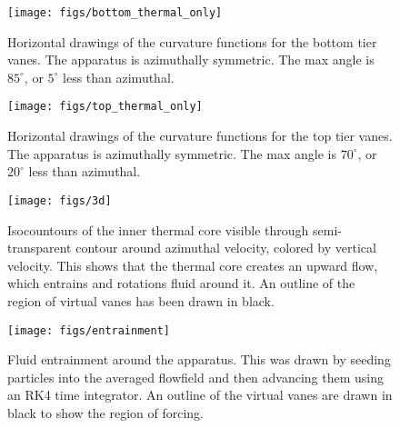 \begin{figure}[htb]
\centering
\begin{minipage}{0.45\textwidth}
\centering
 \texttt{[image: figs/bottom\_thermal\_only]}
 \caption{Horizontal drawings of the curvature functions for the bottom tier
 vanes. The apparatus is azimuthally symmetric. The max angle is
 $85^{\circ}$, or $5^{\circ}$ less than azimuthal.} 
 \label{fig:thermal_vane_bottom}  
\end{minipage}\hfill
\begin{minipage}{0.45\textwidth}
\centering
\texttt{[image: figs/top\_thermal\_only]}
\caption{Horizontal drawings of the curvature functions for the top tier
 vanes. The apparatus is azimuthally symmetric. The max angle is
 $70^{\circ}$, or $20^{\circ}$ less than azimuthal.} 
 \label{fig:thermal_vane_top}  
\end{minipage}
\end{figure}

\begin{figure}[htb]
\centering
\begin{minipage}{0.45\textwidth}
\centering
 \texttt{[image: figs/3d]}
 \caption{Isocountours of the inner thermal core
  visible through semi-transparent contour around azimuthal velocity,
  colored by vertical velocity. This shows that the thermal core creates
 an upward flow, which entrains and rotations fluid around it. An
 outline of the region of virtual vanes has been drawn in black.}
 \label{fig:thermal}  
\end{minipage}\hfill
\begin{minipage}{0.45\textwidth}
\centering
\texttt{[image: figs/entrainment]}
\caption{Fluid entrainment around the apparatus. This was drawn by
 seeding particles into the averaged flowfield and then advancing them
 using an RK4 time integrator. An outline of the
  virtual vanes are drawn in black to show the region of forcing.}
 \label{fig:entrain}  
\end{minipage}
\end{figure}




